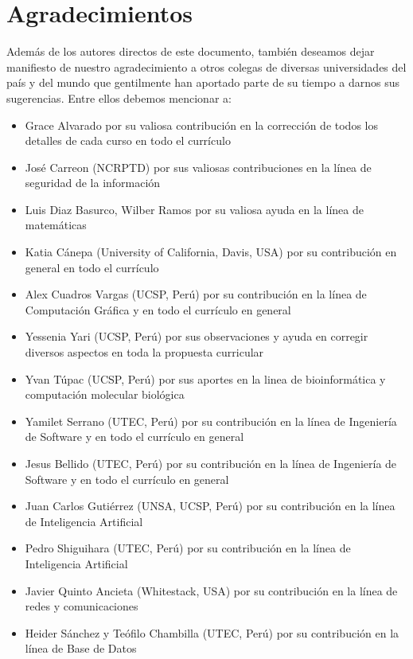 \chapter*{Agradecimientos}\label{chap:cs-ack}
%

Además de los autores directos de este documento, también deseamos dejar manifiesto de nuestro 
agradecimiento a otros colegas de diversas universidades del país y del mundo que gentilmente 
han aportado parte de su tiempo a darnos sus sugerencias. Entre ellos debemos mencionar a:

\begin{itemize}
\item Grace Alvarado por su valiosa contribución en la corrección de todos los detalles de cada curso en todo el currículo
\item José Carreon (NCRPTD) por sus valiosas contribuciones en la línea de seguridad de la información
\item Luis Diaz Basurco, Wilber Ramos por su valiosa ayuda en la línea de matemáticas
\item Katia Cánepa (University of California, Davis, USA) por su contribución en general en todo el currículo
\item Alex Cuadros Vargas (UCSP, Perú) por su contribución en la línea de Computación Gráfica y en todo el currículo en general
\item Yessenia Yari (UCSP, Perú) por sus observaciones y ayuda en corregir diversos aspectos en toda la propuesta curricular
\item Yvan Túpac (UCSP, Perú) por sus aportes en la linea de bioinformática y computación molecular biológica
\item Yamilet Serrano (UTEC, Perú) por su contribución en la línea de Ingeniería de Software y en todo el currículo en general
\item Jesus Bellido (UTEC, Perú) por su contribución en la línea de Ingeniería de Software y en todo el currículo en general
\item Juan Carlos Gutiérrez (UNSA, UCSP, Perú) por su contribución en la línea de Inteligencia Artificial 
\item Pedro Shiguihara (UTEC, Perú) por su contribución en la línea de Inteligencia Artificial 
\item Javier Quinto Ancieta (Whitestack, USA) por su contribución en la línea de redes y comunicaciones
\item Heider Sánchez y Teófilo Chambilla (UTEC, Perú) por su contribución en la línea de Base de Datos

\end{itemize}
